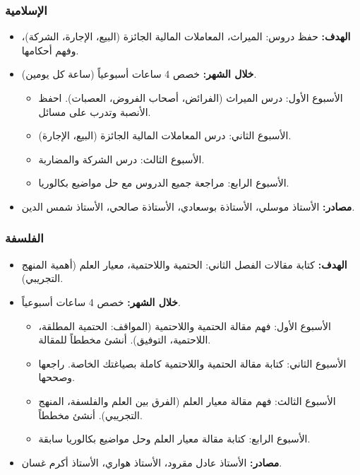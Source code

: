 \documentclass[12pt,a4paper]{book}
\begin{document}
	\subsubsection*{الإسلامية}
	\begin{itemize}
		\item \textbf{الهدف:} حفظ دروس: الميراث، المعاملات المالية الجائزة (البيع، الإجارة، الشركة)، وفهم أحكامها.
		\item \textbf{خلال الشهر:} خصص 4 ساعات أسبوعياً (ساعة كل يومين). 
		\begin{itemize}
			\item الأسبوع الأول: درس الميراث (الفرائض، أصحاب الفروض، العصبات). احفظ الأنصبة وتدرب على مسائل.
			\item الأسبوع الثاني: درس المعاملات المالية الجائزة (البيع، الإجارة).
			\item الأسبوع الثالث: درس الشركة والمضاربة.
			\item الأسبوع الرابع: مراجعة جميع الدروس مع حل مواضيع بكالوريا.
		\end{itemize}
		\item \textbf{مصادر:} الأستاذ موسلي، الأستاذة بوسعادي، الأستاذة صالحي،  \newline الأستاذ شمس الدين.
	\end{itemize}
	
	\subsubsection*{الفلسفة}
	\begin{itemize}
		\item \textbf{الهدف:} كتابة مقالات الفصل الثاني: الحتمية واللاحتمية، معيار العلم (أهمية المنهج التجريبي).
		\item \textbf{خلال الشهر:} خصص 4 ساعات أسبوعياً.
		\begin{itemize}
			\item الأسبوع الأول: فهم مقالة الحتمية واللاحتمية (المواقف: الحتمية المطلقة، اللاحتمية، التوفيق). أنشئ مخططاً للمقالة.
			\item الأسبوع الثاني: كتابة مقالة الحتمية واللاحتمية كاملة بصياغتك الخاصة. راجعها وصححها.
			\item الأسبوع الثالث: فهم مقالة معيار العلم (الفرق بين العلم والفلسفة، المنهج التجريبي). أنشئ مخططاً.
			\item الأسبوع الرابع: كتابة مقالة معيار العلم وحل مواضيع بكالوريا سابقة.
		\end{itemize}
		\item \textbf{مصادر:} الأستاذ عادل مقرود، الأستاذ هواري، الأستاذ أكرم غسان.
	\end{itemize}
	
\end{document}
